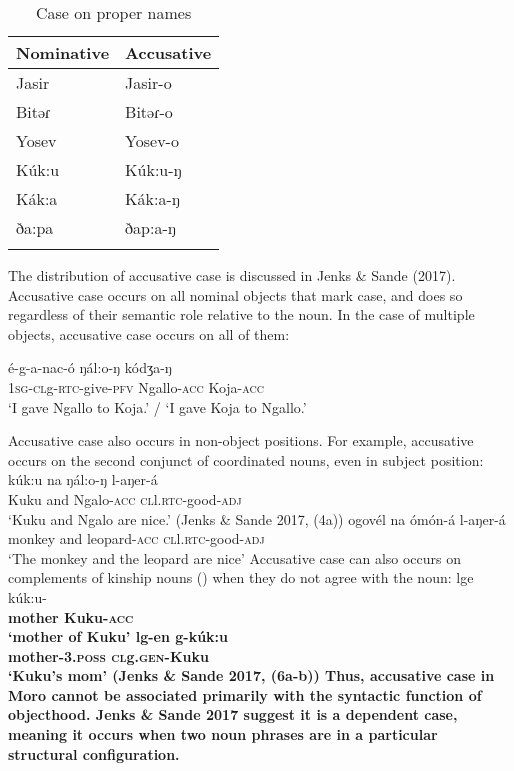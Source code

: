 \begin{table}
\begin{tabular}[t]{ll}
\lsptoprule
Nominative & Accusative\\
 \midrule 
 Jasir & Jasir-o \\
 Bitəɾ & Bitəɾ-o \\
 Yosev & Yosev-o \\
 Kúk:u & Kúk:u-ŋ \\  
 Kák:a & Kák:a-ŋ \\
 ða:pa & ðap:a-ŋ \\
\lspbottomrule
 \end{tabular}
\caption{Case on proper names}\label{tab:ch6:propacc}	
\end{table}

The distribution of accusative case is discussed in Jenks \& Sande (2017). Accusative case occurs on all nominal objects that mark case, and does so regardless of their semantic role relative to the noun. In the case of multiple objects, accusative case occurs on all of them:

\ea \gll  é-g-a-nac-ó ŋál:o-ŋ kódʒa-ŋ\\
\textsc{1sg-cl}g-\textsc{rtc}-give-\textsc{pfv} Ngallo-\textsc{acc} Koja-\textsc{acc}\\
\glt  `I gave Ngallo to Koja.' / `I gave Koja to Ngallo.'
\z 

Accusative case also occurs in non-object positions. For example, accusative occurs on the second conjunct of coordinated nouns, even in subject position:
\ea
\ea  \gll 	kúk:u na ŋál:o-ŋ l-aŋer-\'a\\
			Kuku {and} Ngalo-\textsc{acc} \textsc{cl}l.\textsc{rtc}-good-\textsc{adj} \\
	\glt 	`Kuku and Ngalo are nice.' \hfill (Jenks \& Sande 2017, (4a))
\ex \gll	ogovél na ómón-á l-aŋer-\'a\\
			monkey and leopard-\textsc{acc} \textsc{cl}l.\textsc{rtc}-good-\textsc{adj}\\
	\glt	`The monkey and the leopard are nice' 
\z 
\z
Accusative case can also occurs on complements of kinship nouns () when they do not agree with the noun:
\ea
\ea   \gll lge k\'uk:u-\bf{}\\
mother Kuku-\textsc{acc}\\
\glt  `mother of Kuku'
\gll  lg-en g-k\'uk:u \\
  mother-\textsc{3.poss} \textsc{cl}g.\textsc{gen}-Kuku \\
\glt  `Kuku's mom' \hfill  (Jenks \& Sande 2017, (6a-b))
\z 
\z 
Thus, accusative case in Moro cannot be associated primarily with the syntactic function of objecthood. Jenks \& Sande 2017 suggest it is a dependent case, meaning it occurs when two noun phrases are in a particular structural configuration. 


